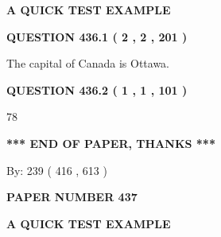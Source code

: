\documentclass[12pt]{article}
\begin{document}
   
 \vspace{0.2in}
{\LARGE {\textbf{ A QUICK TEST EXAMPLE}}}
   
   
  
\vspace{0.2in}
  
{\textbf{\Large{QUESTION
436.1 
 ( 2 , 2 , 201 )
}}}
  
  
 
 
\noindent{}
 
 
The capital of Canada is Ottawa.
 
 
 
 
  
\vspace{0.2in}
  
{\textbf{\Large{QUESTION
436.2 
 ( 1 , 1 , 101 )
}}}
  
  
 
 
\noindent{}

78
 
 
   
   
 \vspace{0.2in}
 
   
   
   
   
\vspace{1.0in} 
{\textbf{\large{ *** END OF PAPER, THANKS *** }}} 
   
   
\hspace{1.0in} By: 
 239 ( 416 ,  613 )
   
   
   
   
\newpage 
\setcounter{page}{ 
   437001 } 
   
   
   
   
 {\textbf{ \Large{ PAPER NUMBER  437  }}}
   
   
\vspace{0.2in}
   
   
   
   
   
   
 \vspace{0.2in}
{\LARGE {\textbf{ A QUICK TEST EXAMPLE}}}
   
   
  
\vspace{0.2in}
  
\end{document}
